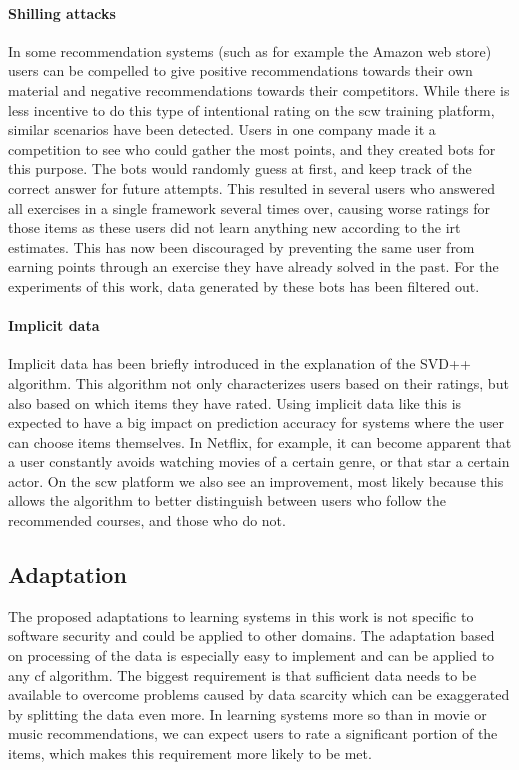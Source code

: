 \paragraph{Shilling attacks}
In some recommendation systems (such as for example the Amazon web store) users can be compelled to give positive recommendations towards their own material and negative recommendations towards their competitors.
While there is less incentive to do this type of intentional rating on the \gls{scw} training platform, similar scenarios have been detected.
Users in one company made it a competition to see who could gather the most points, and they created bots for this purpose.
The bots would randomly guess at first, and keep track of the correct answer for future attempts.
This resulted in several users who answered all exercises in a single framework several times over, causing worse ratings for those items as these users did not learn anything new according to the \gls{irt} estimates.
This has now been discouraged by preventing the same user from earning points through an exercise they have already solved in the past.
For the experiments of this work, data generated by these bots has been filtered out.

\paragraph{Implicit data}
Implicit data has been briefly introduced in the explanation of the SVD++ algorithm.
This algorithm not only characterizes users based on their ratings, but also based on which items they have rated.
Using implicit data like this is expected to have a big impact on prediction accuracy for systems where the user can choose items themselves.
In Netflix, for example, it can become apparent that a user constantly avoids watching movies of a certain genre, or that star a certain actor.
On the \gls{scw} platform we also see an improvement, most likely because this allows the algorithm to better distinguish between users who follow the recommended courses, and those who do not.

\subsection{Adaptation}
The proposed adaptations to learning systems in this work is not specific to software security and could be applied to other domains.
The adaptation based on processing of the data is especially easy to implement and can be applied to any \gls{cf} algorithm.
The biggest requirement is that sufficient data needs to be available to overcome problems caused by data scarcity which can be exaggerated by splitting the data even more.
In learning systems more so than in movie or music recommendations, we can expect users to rate a significant portion of the items, which makes this requirement more likely to be met.

